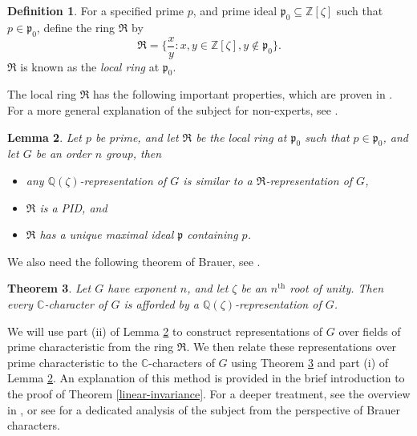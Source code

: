 \documentclass[12pt]{amsproc} %
\newtheorem{thm}{Theorem}[section]
\newtheorem{lem}[thm]{Lemma}
\theoremstyle{definition}\newtheorem{defn}[thm]{Definition}
\theoremstyle{definition}\newtheorem{rem}[thm]{Remark}
\theoremstyle{definition}\newtheorem{ex}[thm]{Example}
\newcommand{\Q}{\mathbb{Q}}
\newcommand{\C}{\mathbb{C}}
\newcommand{\Z}{\mathbb{Z}}
\newcommand{\frakR}{\mathfrak{R}}
\newcommand{\p}{\mathfrak{p}}
\begin{document}
\begin{defn}\label{def-R}
	For a specified prime $p$, and prime ideal $\p_0 \subseteq \Z[\zeta]$ such that $p \in \p_0$, define the ring $\frakR$ by
		\begin{equation*}
			\frakR = \biggl\{\frac{x}{y}: x,y\in\Z[\zeta], y\not\in\p_0\biggr\}.
		\end{equation*}
	$\frakR$ is known as the \textit{local ring} at $\p_0$.
\end{defn}

The local ring $\frakR$ has the following important properties, which are proven in \cite[4.1]{feit}. For a more general explanation of the subject for non-experts, see \cite[16]{DummitFoote_2004}.

\begin{lem}\label{max-ideal}
	Let $p$ be prime, and let $\frakR$ be the local ring at $\p_0$ such that $p \in \p_0$, and let $G$ be an order $n$ group, then
		\begin{itemize}
			\item[(i)] any $\Q(\zeta)$-representation of $G$ is similar to a $\frakR$-representation of $G$,
			\item[(ii)] $\frakR$ is a PID, and
			\item[(iii)] $\frakR$ has a unique maximal ideal $\p$ containing $p$.
		\end{itemize}
\end{lem}

We also need the following theorem of Brauer, see \cite[Theorem 10.3]{isaacs}.

\begin{thm}\label{Q(z)-rep}
	Let $G$ have exponent $n$, and let $\zeta$ be an $n^\text{th}$ root of unity. Then every $\C$-character of $G$ is afforded by a $\Q(\zeta)$-representation of $G$.
\end{thm}

We will use part (ii) of Lemma \ref{max-ideal} to construct representations of $G$ over fields of prime characteristic from the ring $\frakR$. We then relate these representations over prime characteristic to the $\C$-characters of $G$ using Theorem \ref{Q(z)-rep} and part (i) of Lemma \ref{max-ideal}. An explanation of this method is provided in the brief introduction to the proof of Theorem \ref{linear-invariance}. For a deeper treatment, see the overview in \cite[Chapter 15]{isaacs}, or see \cite{goldschmidt} for a dedicated analysis of the subject from the perspective of Brauer characters.


\end{document}
